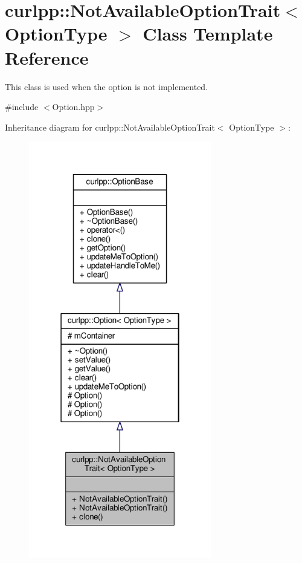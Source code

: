 \hypertarget{classcurlpp_1_1NotAvailableOptionTrait}{\section{curlpp\-:\-:Not\-Available\-Option\-Trait$<$ Option\-Type $>$ Class Template Reference}
\label{classcurlpp_1_1NotAvailableOptionTrait}
}


This class is used when the option is not implemented.  




{\ttfamily \#include $<$Option.\-hpp$>$}



Inheritance diagram for curlpp\-:\-:Not\-Available\-Option\-Trait$<$ Option\-Type $>$\-:
\nopagebreak
\begin{figure}[H]
\begin{center}
\leavevmode
\includegraphics[width=226pt]{classcurlpp_1_1NotAvailableOptionTrait__inherit__graph}
\end{center}
\end{figure}


